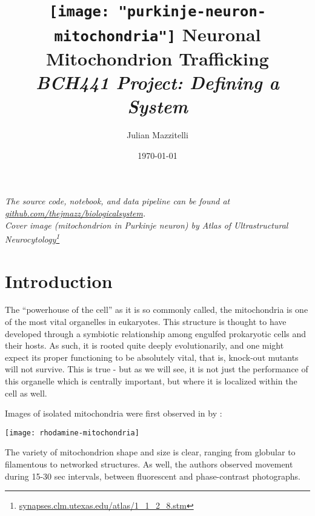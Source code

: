 \title{
\vspace{-155pt}
\hspace*{-80pt}\texttt{[image: "purkinje-neuron-mitochondria"]}
Neuronal Mitochondrion Trafficking \\
\small{\textit{BCH441 Project: Defining a System}}
}
\author{Julian Mazzitelli}
\date{\today}

\maketitle

\begin{bottompar}
\begin{center}
\textit{
The source code, notebook, and data pipeline can be found at
\href{https://github.com/thejmazz/biologicalsystem}{github.com/thejmazz/biologicalsystem}. \\
Cover image (mitochondrion in Purkinje neuron) by Atlas of Ultrastructural Neurocytology\footnote{\href{http://synapses.clm.utexas.edu/atlas/1_1_2_8.stm}{synapses.clm.utexas.edu/atlas/1\_1\_2\_8.stm}}
}
\end{center}
\end{bottompar}

\tableofcontents


\section{Introduction}

The ``powerhouse of the cell'' as it is so commonly called, the mitochondria is
one of the most vital organelles in eukaryotes. This structure is thought to
have developed through a symbiotic relationship among engulfed prokaryotic cells
and their hosts. As such, it is rooted quite deeply evolutionarily, and one
might expect its proper functioning to be absolutely vital, that is, knock-out
mutants will not survive. This is true - but as we will see, it is not just the
performance of this organelle which is centrally important, but where it is
localized within the cell as well.

Images of isolated mitochondria were first observed in \citeyear{Lincoln1979}
by \citeauthor{Lincoln1979}:

\begin{center}
  \texttt{[image: rhodamine-mitochondria]}
\end{center}

\noindent The variety of mitochondrion shape and size is clear, ranging from
globular to filamentous to networked structures. As well, the authors observed
movement during 15-30 sec intervals, between fluorescent and phase-contrast
photographs.

